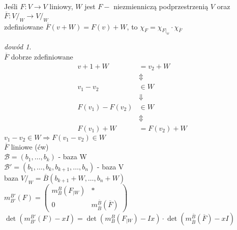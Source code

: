 \documentclass[10pt]{article}
\theoremstyle{definition}
\theoremstyle{definition}
\theoremstyle{definition}
\theoremstyle{definition}
\theoremstyle{remark}
\newtheorem*{dd}{dowód}
\theoremstyle{definition}
\theoremstyle{definition}
\theoremstyle{definition}
\theoremstyle{definition}
\theoremstyle{definition}
\begin{document}
\begin{ft} 
    Jeśli $F: V \to V$ liniowy, $W$ jest $F-$ niezmienniczą podprzestrzenią $V$ oraz $\overline F: V/_{W} \to V/_W$ \\ 
    zdefiniowane $\overline F (v+W) = F(v) + W$, to $\chi_F = \chi_{F|_w} \cdot \chi_{\overline F}$
\end{ft} 
\begin{dd} ~\\ 
    $\overline F$ dobrze zdefiniowane 
    \begin{align*}
        v+1 + W &= v_2 + W  \\ 
                &\Updownarrow \\
        v_1 - v_2 &\in W  \\ 
                  &\Downarrow  \\ 
        F(v_1) - F(v_2) &\in W \\ 
                        &\Updownarrow \\
        F(v_1) + W &= F(v_2) + W
    \end{align*} 
    $v_1 - v_2 \in W \Rightarrow F(v_1 - v_2) \in W$ \\ 
    $\overline F$ liniowe (ćw) \\ 
    $\mathcal B = (b_1,\ldots,b_k)$ - baza W \\ 
    $\mathcal B' = (b_1,\ldots,b_k,b_{k+1},\ldots,b_n)$ - baza V \\ 
    baza $V/_W = \overline B (b_{k+1}+W,\ldots,b_n+W)$ \\ 
    $m_{B'}^{B'} (F) = \begin{pmatrix} m_B^B (F_{|W}) & \ast \\ 0 & m_{\overline B}^{\overline B}(\overline F) \end{pmatrix}$ \\
    $\det(m_{B'}^{B'} (F) - xI) = \det (m_B^B (F_{|{W}}) - Ix) \cdot 
    \det (m_{\overline B}^{\overline B} (\overline F) - xI)$
\end{dd}
\end{document}
